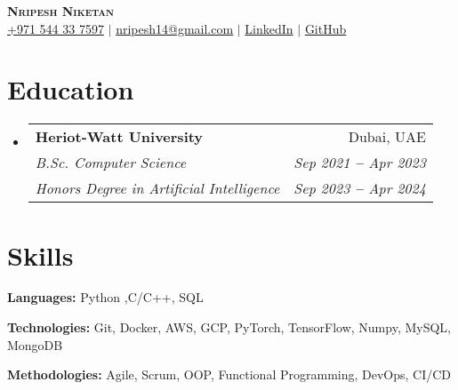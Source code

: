 \documentclass[letterpaper,11pt]{article}
\makeatletter
\newcommand{\resumeEducationHeading}[6]{
  \vspace{-2pt}\item
    \begin{tabular*}{0.97\textwidth}[t]{l@{\extracolsep{\fill}}r}
      \textbf{#1} & #2 \\
      \textit{\small#3} & \textit{\small #4} \\
      \textit{\small#5} & \textit{\small #6} \\
    \end{tabular*}\vspace{-5pt}
}
\newcommand{\resumeSubHeadingListStart}{\begin{itemize}[leftmargin=0.15in, label={}]}
\newcommand{\resumeSubHeadingListEnd}{\end{itemize}}
\makeatother
\begin{document}

\begin{center}
    \textbf{\Huge \scshape Nripesh Niketan} \\ \vspace{3pt}
    \small
    \faMobile \hspace{.5pt} \href{tel:971544337597}{+971 544 33 7597}
    $|$
    \faAt \hspace{.5pt} \href{mailto:nripesh14@gmail.com}{nripesh14@gmail.com}
    $|$
    \faLinkedinSquare \hspace{.5pt} \href{https://www.linkedin.com/in/nripeshn/}{LinkedIn}
    $|$
    \faGithub \hspace{.5pt} \href{https://github.com/NripeshN}{GitHub}
\end{center}




\section{Education}
  \vspace{3pt}
  \resumeSubHeadingListStart
    
    \resumeEducationHeading
      {Heriot-Watt University}{Dubai, UAE}
      {B.Sc. Computer Science}{Sep 2021 \textbf{--} Apr 2023}
      {Honors Degree in Artificial Intelligence}{Sep 2023 \textbf{--} Apr 2024}
  \resumeSubHeadingListEnd




\section{Skills}
  \vspace{2pt}
  \resumeSubHeadingListStart
    \small{\item{
        
        \textbf{Languages:}{ Python ,C/C++, SQL } \\ \vspace{3pt}
        
        \textbf{Technologies:}{ Git, Docker, AWS, GCP, PyTorch, TensorFlow, Numpy, MySQL, MongoDB } \\ \vspace{3pt}
        
        \textbf{Methodologies:}{ Agile, Scrum, OOP, Functional Programming, DevOps, CI/CD} \\ \vspace{3pt}
        
    }}
  \resumeSubHeadingListEnd
\end{document}
